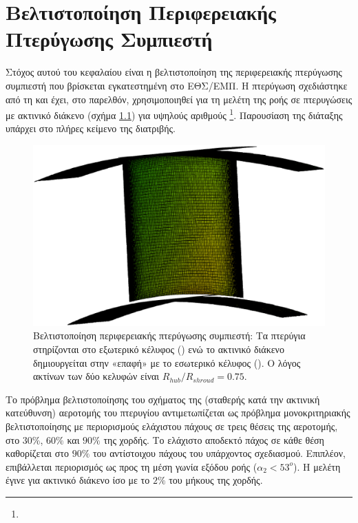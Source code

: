 \ifpdf
    \graphicspath{{6/figures/PNG/}{6/figures/PDF/}{6/figures/}}
\else
    \graphicspath{{6/figures/EPS/}{6/figures/}}
\fi


\chapter{Βελτιστοποίηση Περιφερειακής Πτερύγωσης Συμπιεστή} %
Στόχος αυτού του κεφαλαίου είναι η βελτιστοποίηση της περιφερειακής πτερύγωσης συμπιεστή που βρίσκεται εγκατεστημένη στο ΕΘΣ/ΕΜΠ. Η πτερύγωση σχεδιάστηκε από τη  και έχει, στο παρελθόν, χρησιμοποιηθεί για τη μελέτη της ροής σε πτερυγώσεις με ακτινικό διάκενο (σχήμα \ref{res:ntua_blade:blade}) για υψηλούς αριθμούς  \footnote{}. Παρουσίαση της διάταξης υπάρχει στο πλήρες κείμενο της διατριβής.  
   
\begin{figure}[h!]
\centering
  \includegraphics[width=.5\textwidth]{blade.eps}
  \caption{Βελτιστοποίηση περιφερειακής πτερύγωσης συμπιεστή: Τα πτερύγια στηρίζονται στο εξωτερικό κέλυφος () ενώ  το ακτινικό διάκενο δημιουργείται στην «επαφή» με το εσωτερικό κέλυφος (). Ο λόγος ακτίνων των δύο κελυφών είναι $R_{hub}/R_{shroud}=0.75$.}
  \label{res:ntua_blade:blade}
\end{figure}

Το πρόβλημα βελτιστοποίησης του σχήματος της (σταθερής κατά την ακτινική κατεύθυνση) αεροτομής του πτερυγίου αντιμετωπίζεται ως πρόβλημα μονοκριτηριακής βελτιστοποίησης  με περιορισμούς ελάχιστου πάχους σε τρεις θέσεις της αεροτομής, στο  $30\%$, $60\%$ και $90\%$ της χορδής. Το ελάχιστο αποδεκτό πάχος σε κάθε θέση καθορίζεται στο $90\%$ του αντίστοιχου πάχους του υπάρχοντος σχεδιασμού. Επιπλέον, επιβάλλεται περιορισμός ως προς τη μέση γωνία εξόδου ροής ($\alpha_2<53^o$). Η μελέτη έγινε για ακτινικό διάκενο ίσο με το $2\%$ του μήκους της χορδής.    

